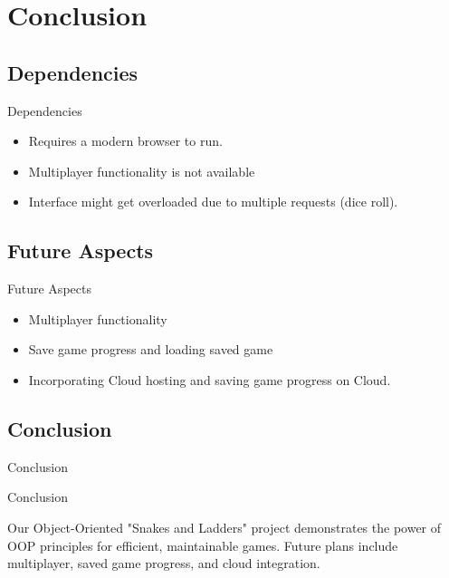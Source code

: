 \documentclass{beamer}
\begin{document}
\section{Conclusion}
\subsection{Dependencies}
\begin{frame}{Dependencies}
    \begin{itemize}
        \item Requires a modern browser to run.
        \item Multiplayer functionality is not available
        \item Interface might get overloaded due to multiple requests (dice roll).
    \end{itemize}
\end{frame}
\subsection{Future Aspects}
\begin{frame}{Future Aspects}
    \begin{itemize}
        \item Multiplayer functionality
        \item Save game progress and loading saved game
        \item Incorporating Cloud hosting and saving game progress on Cloud.
    \end{itemize}
\end{frame}
\subsection{Conclusion}
\begin{frame}{Conclusion}
\begin{block}{Conclusion}
    
Our Object-Oriented "Snakes and Ladders" project demonstrates the power of OOP principles for efficient, maintainable games. Future plans include multiplayer, saved game progress, and cloud integration.
\end{block}

\end{frame}
\end{document}
